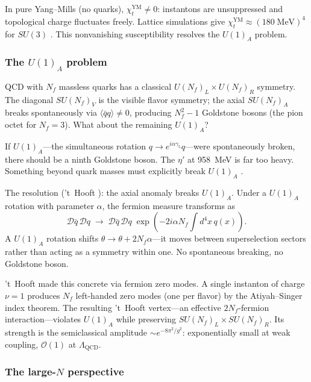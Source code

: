 In pure Yang--Mills (no quarks), $\chi_t^{\mathrm{YM}}\neq 0$: instantons are unsuppressed and topological charge fluctuates freely.  Lattice simulations give $\chi_t^{\mathrm{YM}} \approx (180\;\mathrm{MeV})^4$ for $SU(3)$ \cite{Teper2000TopologyInQCD}.  This nonvanishing susceptibility resolves the $U(1)_A$ problem.

\subsubsection{The $U(1)_A$ problem}

QCD with $N_f$ massless quarks has a classical $U(N_f)_L\times U(N_f)_R$ symmetry.  The diagonal $SU(N_f)_V$ is the visible flavor symmetry; the axial $SU(N_f)_A$ breaks spontaneously via $\langle\bar{q}q\rangle\neq 0$, producing $N_f^2-1$ Goldstone bosons (the pion octet for $N_f=3$).  What about the remaining $U(1)_A$?

If $U(1)_A$---the simultaneous rotation $q\to e^{i\alpha\gamma_5}q$---were spontaneously broken, there should be a ninth Goldstone boson.  The $\eta'$ at 958~MeV is far too heavy.  Something beyond quark masses must explicitly break $U(1)_A$ \cite{tHooft1976BellJackiw}.

The resolution ('t~Hooft \cite{tHooft1976BellJackiw,tHooft1976Pseudoparticle}): the axial anomaly breaks $U(1)_A$.  Under a $U(1)_A$ rotation with parameter $\alpha$, the fermion measure transforms as
\begin{equation}\label{eq:u1a-anomaly}
  \mathcal{D}\bar{q}\,\mathcal{D}q \;\to\; \mathcal{D}\bar{q}\,\mathcal{D}q\;\exp\!\left(-2i\alpha N_f \int d^4x\, q(x)\right).
\end{equation}
A $U(1)_A$ rotation shifts $\theta\to\theta + 2N_f\alpha$---it moves between superselection sectors rather than acting as a symmetry within one.  No spontaneous breaking, no Goldstone boson.

't~Hooft made this concrete via fermion zero modes.  A single instanton of charge $\nu=1$ produces $N_f$ left-handed zero modes (one per flavor) by the Atiyah--Singer index theorem.  The resulting 't~Hooft vertex---an effective $2N_f$-fermion interaction---violates $U(1)_A$ while preserving $SU(N_f)_L\times SU(N_f)_R$.  Its strength is the semiclassical amplitude $\sim e^{-8\pi^2/g^2}$: exponentially small at weak coupling, $\mathcal{O}(1)$ at $\Lambda_{\mathrm{QCD}}$.

\subsubsection{The large-$N$ perspective}

